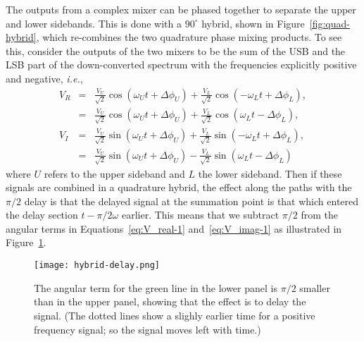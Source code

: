 \documentclass[letterpaper,11pt]{book}
\begin{document}
The outputs from a complex mixer can be phased together to separate
the upper and lower sidebands.  This is done with a $90^{\circ}$ hybrid,
shown in Figure~\ref{fig:quad-hybrid},
which re-combines the two quadrature phase mixing products.
To see this, consider the outputs of the two mixers to be the sum of
the USB and the LSB part of the down-converted spectrum with the
frequencies explicitly positive and negative,
{\itshape i.e.},
\begin{eqnarray}
V_R &=&   \frac{V_{U}}{\sqrt{2}} \cos( \omega_{U} t + \Delta \phi_{U})
        + \frac{V_{L}}{\sqrt{2}} \cos(-\omega_{L} t + \Delta \phi_{L}),
          \label{eq:V_real-1} \\
    &=&   \frac{V_{U}}{\sqrt{2}} \cos(\omega_{U} t + \Delta \phi_{U})
        + \frac{V_{L}}{\sqrt{2}} \cos(\omega_{L} t - \Delta \phi_{L}),
          \label{eq:V_real-2} \\
V_I &=&   \frac{V_{U}}{\sqrt{2}} \sin( \omega_{U} t + \Delta \phi_{U})
        + \frac{V_{L}}{\sqrt{2}} \sin(-\omega_{L} t + \Delta \phi_{L}),
          \label{eq:V_imag-1} \\
    &=&   \frac{V_{U}}{\sqrt{2}} \sin(\omega_{U} t + \Delta \phi_{U})
        - \frac{V_{L}}{\sqrt{2}} \sin(\omega_{L} t - \Delta \phi_{L})
      \label{eq:V_imag-2}
\end{eqnarray}
where $U$ refers to the upper sideband and $L$ the lower sideband.
Then if these signals are combined in a quadrature hybrid, the effect
along the paths with the $\pi/2$ delay is that the delayed signal at
the summation point is that which entered the delay section $t - \pi/2\omega$
earlier.  This means that we subtract $\pi/2$ from the angular terms in 
Equations~\ref{eq:V_real-1} and~\ref{eq:V_imag-1} as illustrated
in Figure~\ref{fig:phase-delay}.
\begin{figure}[h!tb]
\begin{center}
\texttt{[image: hybrid-delay.png]}
\caption[Phase delay]{\label{fig:phase-delay}The angular term for the green line
in the lower panel is $\pi/2$ smaller than in the upper panel, showing that the
effect is to delay the signal. (The dotted
lines show a slighly earlier time for a positive frequency signal; so
the signal moves left with time.)}
\end{center}
\end{figure}
\end{document}
